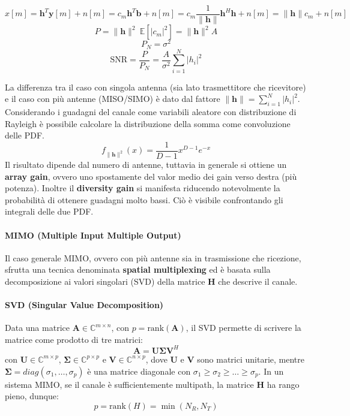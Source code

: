 \[
    x[m] = \mathbf{h}^T \mathbf{y}[m] + n[m] = c_m \mathbf{h}^T \mathbf{b} + n[m] = c_m \frac{1}{\|\mathbf{h}\|} \mathbf{h}^H \mathbf{h} + n[m] = \| \mathbf{h} \| c_m + n[m]
\]
\[
    P = \|\mathbf{h} \|^2 \ \mathbb{E} \left[\left| c_m \right|^2 \right] = \|\mathbf{h} \|^2  A
\]
\[
    P_N = \sigma^2  
\]
\[
    \text{SNR} = \frac{P}{P_N} = \frac{A}{\sigma^2}  \sum_{i=1}^{N} |h_i|^2
\]

La differenza tra il caso con singola antenna (sia lato trasmettitore che ricevitore) e il caso con più antenne (MISO/SIMO) è dato dal fattore $\| \mathbf{h} \| = \sum_{i=1}^{N} |h_i|^2$.
Considerando i guadagni del canale come variabili aleatore con distribuzione di Rayleigh è possibile calcolare la distribuzione della somma come convoluzione delle PDF.
\[
    f_{\| \mathbf{h} \|^2} (x) = \frac{1}{D-1} x^{D-1} e^{-x}
\]
Il risultato dipende dal numero di antenne, tuttavia in generale si ottiene un \textbf{array gain}, ovvero uno spostamente del valor medio dei gain verso destra (più potenza).
Inoltre il \textbf{diversity gain} si manifesta riducendo notevolmente la probabilità di ottenere guadagni molto bassi.
Ciò è visibile confrontando gli integrali delle due PDF.

\paragraph*{MIMO (Multiple Input Multiple Output)}

Il caso generale MIMO, ovvero con più antenne sia in trasmissione che ricezione, sfrutta una tecnica denominata \textbf{spatial multiplexing} ed è basata sulla decomposizione ai valori singolari (SVD) della matrice $\mathbf{H}$ che descrive il canale.

\paragraph*{SVD (Singular Value Decomposition)}

Data una matrice $\mathbf{A} \in \mathbb{C}^{m \times n}$, con  $p = \text{rank} (\mathbf{A})$, il SVD permette di scrivere la matrice come prodotto di tre matrici:
\[
    \mathbf{A} = \mathbf{U} \mathbf{\Sigma} \mathbf{V}^H
\]
con $\mathbf{U} \in \mathbb{C}^{m \times p}$, $\mathbf{\Sigma} \in \mathbb{C}^{p \times p}$ e $\mathbf{V} \in \mathbb{C}^{n \times p}$,
dove $\mathbf{U}$ e $\mathbf{V}$ sono matrici unitarie, mentre $\mathbf{\Sigma} = diag(\sigma_1, \ldots, \sigma_p)$ è una matrice diagonale con $\sigma_1 \geq \sigma_2 \geq \ldots \geq \sigma_p$. In un sistema MIMO, se il canale è sufficientemente multipath, la matrice $\mathbf{H}$ ha rango pieno, dunque:
\[
    p = \text{rank}(H) = \min(N_R, N_T)
\]

